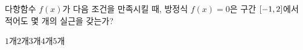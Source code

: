 다항함수 $f(x)$가 다음 조건을 만족시킬 때, 방정식 $f(x)=0$은 구간 $[-1{,}\mkern3mu\mathopen{}2]$에서 적어도 몇 개의 실근을 갖는가?  
\begin{choices32}{$1$개}{$2$개}{$3$개}{$4$개}{$5$개}\end{choices32}

